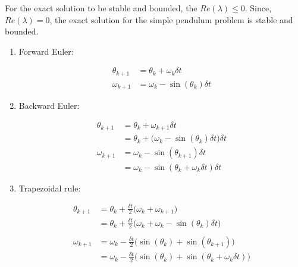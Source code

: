 \documentclass[a4paper,11pt]{report}
\begin{document}
\begin{enumerate}
    For the exact solution to be stable and bounded, the $Re(\lambda) \le 0$. 
    Since, $Re(\lambda) = 0$, the exact solution for the simple pendulum problem
    is stable and bounded.


    \begin{enumerate}

    \item Forward Euler:
    
    \begin{equation*}
    \begin{aligned}
    \theta_{k+1} &= \theta_{k} + \omega_{k} \delta t \\
    \omega_{k+1} &= \omega_{k} - \sin(\theta_{k}) \delta t
    \end{aligned}
    \end{equation*}

    \item Backward Euler:

    \begin{equation*}
    \begin{aligned}
    \theta_{k+1} &= \theta_{k} + \omega_{k+1} \delta t \\
                 &= \theta_{k} + \Big( \omega_{k} - \sin(\theta_{k}) \delta t \Big) \delta t \\
    \omega_{k+1} &= \omega_{k} - \sin(\theta_{k+1}) \delta t \\
                 &= \omega_{k} - \sin(\theta_{k} + \omega_{k} \delta t) \delta t
    \end{aligned}
    \end{equation*}

    \item Trapezoidal rule:

    \begin{equation*}
    \begin{aligned}
    \theta_{k+1} &= \theta_{k} + \frac{\delta t}{2} \Big( \omega_{k} + \omega_{k+1} \Big) \\
                 &= \theta_{k} + \frac{\delta t}{2} \Big( \omega_{k} + \omega_{k} - \sin(\theta_{k}) \delta t \Big) \\ \\
    \omega_{k+1} &= \omega_{k} - \frac{\delta t}{2} \Big( \sin(\theta_{k}) + \sin(\theta_{k+1}) \Big) \\
                 &= \omega_{k} - \frac{\delta t}{2} \Big( \sin(\theta_{k}) + \sin(\theta_{k} + \omega_{k} \delta t) \Big)
    \end{aligned}
    \end{equation*}


\end{enumerate}
\end{enumerate}
\end{document}
